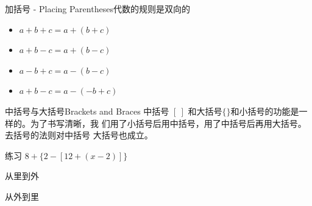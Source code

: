 \documentclass{beamer}
\begin{document}
    \begin{frame}{加括号 - Placing Parentheses}{代数的规则是双向的}
        \begin{alertblock}{}
            \begin{itemize}
                \item $a + b +c = a+(b+c)$
                \item $a + b - c = a+(b-c)$ 
                \item $ a -b + c= a-(b-c)$ 
                \item $ a + b -c= a-(-b+c) $
            \end{itemize}
        \end{alertblock}
    \end{frame}

    \begin{frame}{中括号与大括号}{Brackets and Braces}
        中括号 $[ \  ]$ 和大括号$\{ \}$和小括号的功能是一样的。为了书写清晰，我
        们用了小括号后用中括号，用了中括号后再用大括号。去括号的法则对中括号
        大括号也成立。
    \end{frame}

    \begin{frame}{练习}
        $8 + \{2 − [12 + (x − 2)]\}$

        \pause

        从里到外

        从外到里
    \end{frame}
\end{document}
